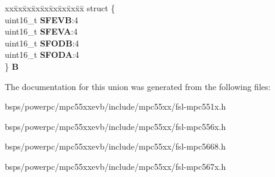 \begin{DoxyCompactItemize}
\begin{tabbing}
\end{tabbing}\item 
\mbox{\label{unionuSFCNTR_a0a4f41d81f9eb2f5146581789c9287ce}} 
\begin{tabbing}
xx\=xx\=xx\=xx\=xx\=xx\=xx\=xx\=xx\=\kill
struct \{\\
\>uint16\_t {\bfseries SFEVB}:4\\
\>uint16\_t {\bfseries SFEVA}:4\\
\>uint16\_t {\bfseries SFODB}:4\\
\>uint16\_t {\bfseries SFODA}:4\\
\} {\bfseries B}\\

\end{tabbing}\end{DoxyCompactItemize}


The documentation for this union was generated from the following files\+:\begin{DoxyCompactItemize}
\item 
bsps/powerpc/mpc55xxevb/include/mpc55xx/fsl-\/mpc551x.\+h\item 
bsps/powerpc/mpc55xxevb/include/mpc55xx/fsl-\/mpc556x.\+h\item 
bsps/powerpc/mpc55xxevb/include/mpc55xx/fsl-\/mpc5668.\+h\item 
bsps/powerpc/mpc55xxevb/include/mpc55xx/fsl-\/mpc567x.\+h\end{DoxyCompactItemize}
